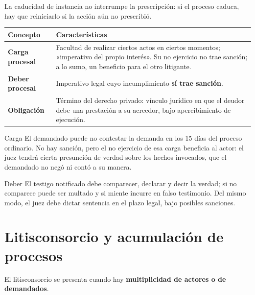 \documentclass[12pt,oneside]{book}
\renewcommand{\arraystretch}{1.15}
\begin{document}
\begin{nota}
La caducidad de instancia no interrumpe la prescripción: si el proceso caduca, hay que reiniciarlo si la acción aún no prescribió.
\end{nota}

\begin{table}[H]
\centering
\renewcommand{\arraystretch}{1.25}
\begin{tabularx}{\textwidth}{>{\bfseries\RaggedRight\arraybackslash}p{}>{\RaggedRight\arraybackslash}X}
\toprule
Concepto & Características \\
\midrule
Carga procesal & Facultad de realizar ciertos actos en ciertos momentos; «imperativo del propio interés». Su no ejercicio no trae sanción; a lo sumo, un beneficio para el otro litigante. \\
\addlinespace
Deber procesal & Imperativo legal cuyo incumplimiento \textbf{sí trae sanción}. \\
\addlinespace
Obligación & Término del derecho privado: vínculo jurídico en que el deudor debe una prestación a su acreedor, bajo apercibimiento de ejecución. \\
\bottomrule
\end{tabularx}
\end{table}

\begin{ejemplo}{Carga}
El demandado puede no contestar la demanda en los 15 días del proceso ordinario. No hay sanción, pero el no ejercicio de esa carga beneficia al actor: el juez tendrá cierta presunción de verdad sobre los hechos invocados, que el demandado no negó ni contó a su manera.
\end{ejemplo}

\begin{ejemplo}{Deber}
El testigo notificado debe comparecer, declarar y decir la verdad; si no comparece puede ser multado y si miente incurre en falso testimonio. Del mismo modo, el juez debe dictar sentencia en el plazo legal, bajo posibles sanciones.
\end{ejemplo}

\section{Litisconsorcio y acumulación de procesos}

El litisconsorcio se presenta cuando hay \textbf{multiplicidad de actores o de demandados}.
\end{document}

